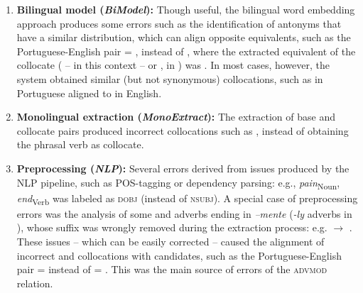 \documentclass[output=paper,modfonts,nonflat]{langsci/langscibook}
\begin{document}
\begin{enumerate}
\item \textbf{Bilingual model (\textit{BiModel}):} Though useful, the bilingual word embedding approach
  produces some errors such as the identification of antonyms that have a similar distribution, which can align opposite 
  equivalents, such as the Portuguese-English pair  = , instead of , where the extracted equivalent of the collocate  ( -- in this context -- or , in )
  was . In most cases, however, the system obtained similar
  (but not synonymous) collocations, such as  in Portuguese aligned to  in English.

\item \textbf{Monolingual extraction (\textit{MonoExtract}):} The extraction of base and
  collocate pairs produced incorrect collocations such as
  ,
  instead of obtaining the phrasal verb  as collocate.  
  
\item \textbf{Preprocessing (\textit{NLP}):} Several errors derived from issues produced
  by the NLP pipeline, such as POS-tagging or dependency parsing:
  e.g., \textit{pain}\textsubscript{Noun},\\\textit{end}\textsubscript{Verb} was labeled
  as \textsc{dobj} (instead of \textsc{nsubj}).
  A special case of preprocessing errors was the analysis of some 
  and  adverbs ending in \emph{--mente} (\emph{-ly} adverbs in ),
  whose suffix was wrongly removed during the extraction process: e.g.  $\rightarrow$ . These issues -- which can be easily corrected --
  caused the alignment of incorrect  and   collocations with
   candidates, such as the Portuguese-English pair  =  instead of  = . This was the main source of errors of the \textsc{advmod} relation.


\end{enumerate}
\end{document}
